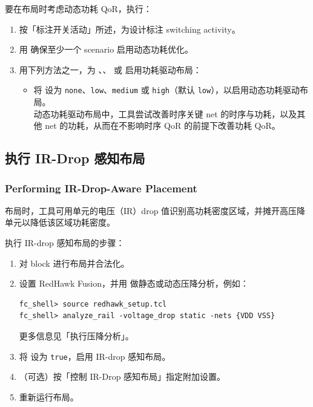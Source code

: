 要在布局时考虑动态功耗 QoR，执行：
\begin{enumerate}
  \item 按「标注开关活动」所述，为设计标注 switching activity。
  \item 用  确保至少一个 scenario 启用动态功耗优化。
  \item 用下列方法之一，为 、、 或  启用功耗驱动布局：
        \begin{itemize}
          \item 将  设为 \texttt{none}、\texttt{low}、\texttt{medium} 或 \texttt{high}（默认 \texttt{low}），以启用动态功耗驱动布局。\\
                动态功耗驱动布局中，工具尝试改善时序关键 net 的时序与功耗，以及其他 net 的功耗，从而在不影响时序 QoR 的前提下改善功耗 QoR。
        \end{itemize}
\end{enumerate}

\subsection{执行 IR-Drop 感知布局}
\subsubsection*{Performing IR-Drop-Aware Placement}

布局时，工具可用单元的电压（IR）drop 值识别高功耗密度区域，并摊开高压降单元以降低该区域功耗密度。

执行 IR-drop 感知布局的步骤：
\begin{enumerate}
  \item 对 block 进行布局并合法化。
  \item 设置 RedHawk Fusion，并用  做静态或动态压降分析，例如：
\begin{lstlisting}
fc_shell> source redhawk_setup.tcl
fc_shell> analyze_rail -voltage_drop static -nets {VDD VSS}
\end{lstlisting}
        更多信息见「执行压降分析」。
  \item 将  设为 \texttt{true}，启用 IR-drop 感知布局。
  \item （可选）按「控制 IR-Drop 感知布局」指定附加设置。
  \item 重新运行布局。
\end{enumerate}

